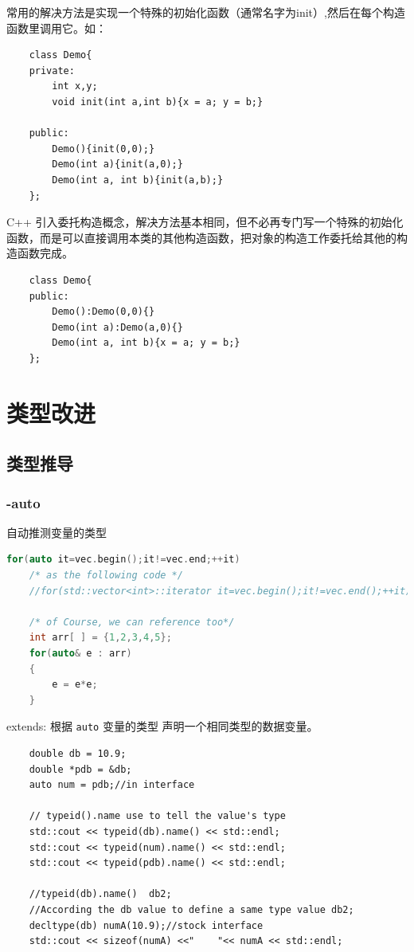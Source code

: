 \documentclass[UTF8,a4paper,12pt]{ctexbook} %
\begin{document}
			常用的解决方法是实现一个特殊的初始化函数（通常名字为init）,然后在每个构造函数里调用它。如：
				\begin{lstlisting}
	class Demo{
	private:
		int x,y;
		void init(int a,int b){x = a; y = b;}
	
	public:
		Demo(){init(0,0);}
		Demo(int a){init(a,0);}
		Demo(int a, int b){init(a,b);}
	};				
				\end{lstlisting}
			
			C++ 引入委托构造概念，解决方法基本相同，但不必再专门写一个特殊的初始化函数，而是可以直接调用本类的其他构造函数，把对象的构造工作委托给其他的构造函数完成。
				\begin{lstlisting}
	class Demo{
	public:
		Demo():Demo(0,0){}
		Demo(int a):Demo(a,0){}
		Demo(int a, int b){x = a; y = b;}
	};				
				\end{lstlisting}
	
	\section{类型改进}
		\subsection{类型推导}
			\subsubsection{-auto}
			自动推测变量的类型
				\begin{lstlisting}[language=C++]
	for(auto it=vec.begin();it!=vec.end;++it)
	/* as the following code */
	//for(std::vector<int>::iterator it=vec.begin();it!=vec.end();++it)
	
	/* of Course, we can reference too*/
	int arr[ ] = {1,2,3,4,5};
	for(auto& e : arr) 
	{
		e = e*e;
	}				
				\end{lstlisting}
				
				extends: 根据 \verb|auto| 变量的类型 声明一个相同类型的数据变量。
				\begin{lstlisting}
	double db = 10.9;
	double *pdb = &db;
	auto num = pdb;//in interface
	
	// typeid().name use to tell the value's type
	std::cout << typeid(db).name() << std::endl;
	std::cout << typeid(num).name() << std::endl;
	std::cout << typeid(pdb).name() << std::endl;
	
	//typeid(db).name()  db2;
	//According the db value to define a same type value db2;
	decltype(db) numA(10.9);//stock interface
	std::cout << sizeof(numA) <<"    "<< numA << std::endl;										
				\end{lstlisting}
		
\end{document}

